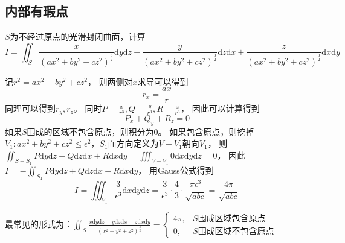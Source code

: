 \subsection{内部有瑕点}


\begin{exercise}[经典题目]
  $S$为不经过原点的光滑封闭曲面，计算
  \begin{equation*}
    I = \iint_S \frac{x}{(ax^2 + by^2 + cz^2)^{\frac{3}{2}}} \mathrm{d} y \mathrm{d} z + \frac{y}{(ax^2 + by^2 + cz^2)^{\frac{3}{2}}}\mathrm{d} z \mathrm{d} x + \frac{z}{(ax^2 + by^2 + cz^2)^{\frac{3}{2}}}\mathrm{d}x\mathrm{d}y
  \end{equation*}
\end{exercise}

\begin{solution}
  记$r^2 = ax^2 + by^2 + cz^2$，
  则两侧对$x$求导可以得到
  \begin{equation*}
    r_x = \frac{ax}{r}
  \end{equation*}
  同理可以得到$r_y, r_z$。
  同时$P = \frac{x}{r^3}, Q = \frac{y}{r^3}, R = \frac{z}{r^3}$，
  因此可以计算得到
  \begin{equation*}
    P_x + Q_y + R_z = 0
  \end{equation*}
  如果$S$围成的区域不包含原点，则积分为$0$。
  如果包含原点，则挖掉$V_1:ax^2 + by^2 + cz^2 \leq \epsilon^2$，$S_1$面方向定义为$V - V_1$朝向$V_1$，
  则$\iint_{S + S_1}P\mathrm{d} y \mathrm{d} z + Q\mathrm{d}z \mathrm{d}x + R \mathrm{d} x \mathrm{d} y = \iiint_{V - V_1}0 \mathrm{d} x \mathrm{d} y \mathrm{d} z = 0$，
  因此$I = -\iint _{S_1} P\mathrm{d} y \mathrm{d} z + Q\mathrm{d} z \mathrm{d} x + R \mathrm{d} x \mathrm{d} y$，
  用Gauss公式得到
  \begin{equation*}
    I = \iiint_{V_1} \frac{3}{\epsilon^3} \mathrm{d} x \mathrm{d} y \mathrm{d} z = \frac{3}{\epsilon^3} \cdot \frac{4}{3}\cdot \frac{\pi \epsilon^3}{\sqrt{abc}} = \frac{4\pi}{\sqrt{abc}}
  \end{equation*}
\end{solution}

\begin{note}
  最常见的形式为：$\iint_S \frac{x\mathrm{d} y \mathrm{d} z + y\mathrm{d} z \mathrm{d} x + z \mathrm{d} x \mathrm{d} y}{(x^2 + y^2 + z^2)^{\frac{3}{2}}} =
  \begin{cases}
    4\pi, &S\text{围成区域包含原点}\\
    0, &S\text{围成区域不包含原点}
  \end{cases}
  $
\end{note}

